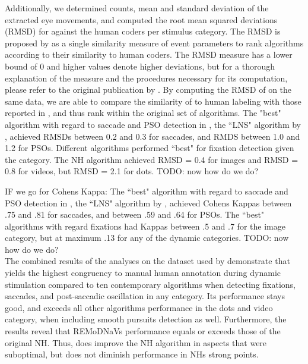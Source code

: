  Additionally, we determined counts, mean and standard deviation of the extracted eye movements, and computed the root
 mean squared deviations (RMSD) for \remodnav against the human coders per stimulus category. The RMSD is proposed by
 \cite{Andersson2017} as a single similarity measure of event parameters to rank algorithms according to their
 similarity to human coders. The RMSD measure has a lower bound of 0 and higher values denote higher deviations,
 but for a thorough explanation of the measure and the procedures necessary for its computation, please refer to the
 original publication by \cite{Andersson2017}. By computing the RMSD of \remodnav on the same data, we are able to
 compare the similarity of \remodnav to human labeling with those reported in \cite{Andersson2017}, and thus rank
 \remodnav within the original set of algorithms. 
 The "best" algorithm with regard to saccade and PSO detection in \cite{Andersson2017}, the ``LNS" algorithm by
 \cite{Larsson2013}, achieved RMSDs between 0.2 and 0.3 for saccades, and RMDS between 1.0 and 1.2 for PSOs. Different
 algorithms performed ``best" for fixation detection given the category. The NH algorithm achieved RMSD = 0.4 for
 images and RMSD = 0.8 for videos, but RMSD = 2.1 for dots. TODO: now how do we do?

 IF we go for Cohens Kappa: The ``best" algorithm with regard to saccade and PSO detection in \cite{Andersson2017}, the
 ``LNS" algorithm by \cite{Larsson2013}, achieved Cohens Kappas between .75 and .81 for saccades, and between .59 and
 .64 for PSOs. The ``best" algorithms with regard fixations had Kappas between .5 and .7 for the image category, but
 at maximum .13 for any of the dynamic categories. TODO: now how do we do? \\

The combined results of the analyses on the dataset used by \citet{Andersson2017} demonstrate that \remodnav yields
the highest congruency to manual human annotation during dynamic stimulation compared to ten contemporary
algorithms when detecting fixations, saccades, and post-saccadic oscillation in any category. Its performance
stays good, and exceeds all other algorithms performance in the dots and video category, when including smooth
pursuits detection as well. Furthermore, the results reveal that REMoDNaVs performance equals or exceeds those of
the original NH. Thus, \remodnav does improve the NH algorithm in aspects that were suboptimal, but does not
diminish performance in NHs strong points.



